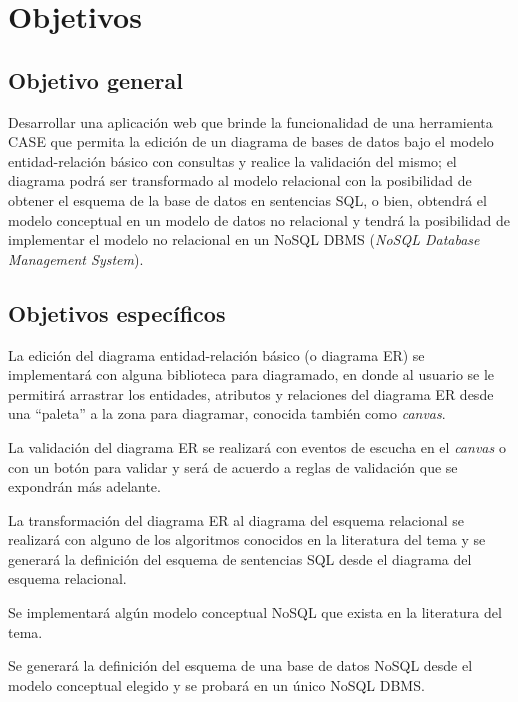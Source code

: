 \section{Objetivos}

\subsection*{Objetivo general}
Desarrollar una aplicación web que brinde la funcionalidad de una herramienta CASE que permita la edición de un diagrama de bases de datos bajo el modelo entidad-relación básico con consultas y realice la validación del mismo; el diagrama podrá ser transformado al modelo relacional con la posibilidad de obtener el esquema de la base de datos en sentencias SQL, o bien, obtendrá el modelo conceptual en un modelo de datos no relacional y tendrá la posibilidad de implementar el modelo no relacional en un NoSQL DBMS (\textit{NoSQL Database Management System}).

\subsection*{Objetivos específicos}\label{sec:objSpecifics}

La edición del diagrama entidad-relación básico (o diagrama ER) se implementará con alguna biblioteca para diagramado, en donde al usuario se le permitirá arrastrar los entidades, atributos y relaciones del diagrama ER desde una ``paleta''  a la zona para diagramar, conocida también como \textit{canvas}.


La validación del diagrama ER se realizará con eventos de escucha en el \textit{canvas} o con un botón para validar y será de acuerdo a reglas de validación que se expondrán más adelante.


La transformación del diagrama ER al diagrama del esquema relacional se realizará con alguno de los algoritmos conocidos en la literatura del tema y se generará la definición del esquema de sentencias SQL desde el diagrama del esquema relacional.


Se implementará algún modelo conceptual NoSQL que exista en la literatura del tema.


Se generará la definición del esquema de una base de datos NoSQL desde el modelo conceptual elegido y se probará en un único NoSQL DBMS.